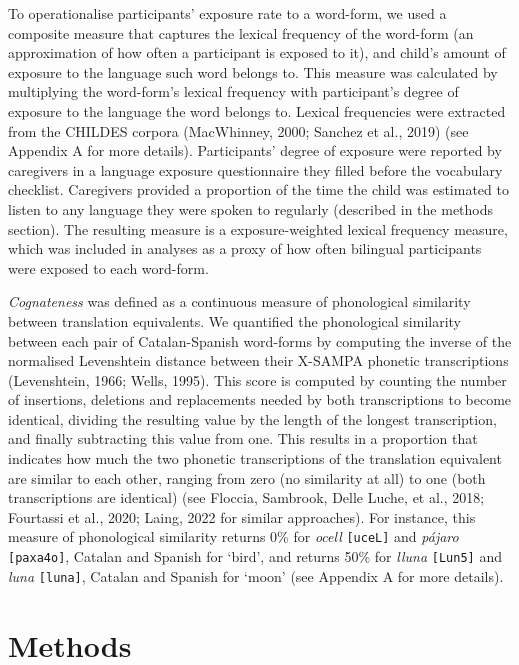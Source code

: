 \documentclass[
  man,
  floatsintext,
  colorlinks=true,linkcolor=blue,citecolor=blue,urlcolor=blue,biblatex]{apa7}
\begin{document}
To operationalise participants' exposure rate to a word-form, we used a
composite measure that captures the lexical frequency of the word-form
(an approximation of how often a participant is exposed to it), and
child's amount of exposure to the language such word belongs to. This
measure was calculated by multiplying the word-form's lexical frequency
with participant's degree of exposure to the language the word belongs
to. Lexical frequencies were extracted from the CHILDES corpora
(MacWhinney, 2000; Sanchez et al., 2019) (see Appendix A for more
details). Participants' degree of exposure were reported by caregivers
in a language exposure questionnaire they filled before the vocabulary
checklist. Caregivers provided a proportion of the time the child was
estimated to listen to any language they were spoken to regularly
(described in the methods section). The resulting measure is a
exposure-weighted lexical frequency measure, which was included in
analyses as a proxy of how often bilingual participants were exposed to
each word-form.

\emph{Cognateness} was defined as a continuous measure of phonological
similarity between translation equivalents. We quantified the
phonological similarity between each pair of Catalan-Spanish word-forms
by computing the inverse of the normalised Levenshtein distance between
their X-SAMPA phonetic transcriptions (Levenshtein, 1966; Wells, 1995).
This score is computed by counting the number of insertions, deletions
and replacements needed by both transcriptions to become identical,
dividing the resulting value by the length of the longest transcription,
and finally subtracting this value from one. This results in a
proportion that indicates how much the two phonetic transcriptions of
the translation equivalent are similar to each other, ranging from zero
(no similarity at all) to one (both transcriptions are identical) (see
Floccia, Sambrook, Delle Luche, et al., 2018; Fourtassi et al., 2020;
Laing, 2022 for similar approaches). For instance, this measure of
phonological similarity returns 0\% for \emph{ocell} \texttt{{[}uceL{]}}
and \emph{pájaro} \texttt{{[}paxa4o{]}}, Catalan and Spanish for `bird',
and returns 50\% for \emph{lluna} \texttt{{[}Lun5{]}} and \emph{luna}
\texttt{{[}luna{]}}, Catalan and Spanish for `moon' (see Appendix A for
more details).

\hypertarget{sec-methods}{%
\section{Methods}\label{sec-methods}}
\end{document}
